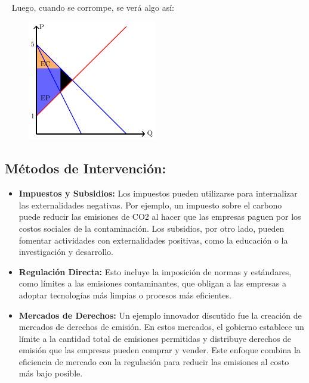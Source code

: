 \documentclass[
  letterpaper,
  DIV=11,
  numbers=noendperiod]{scrreport}
\begin{document}
~ Luego, cuando se corrompe, se verá algo así:

\begin{figure}

{\centering \includegraphics[width=0.5\textwidth,height=\textheight]{4sistimpo_files/figure-pdf/unnamed-chunk-2-1.pdf}

}

\end{figure}

\hypertarget{muxe9todos-de-intervenciuxf3n}{%
\subsection{Métodos de
Intervención:}\label{muxe9todos-de-intervenciuxf3n}}

\begin{itemize}
\item
  \textbf{Impuestos y Subsidios:} Los impuestos pueden utilizarse para
  internalizar las externalidades negativas. Por ejemplo, un impuesto
  sobre el carbono puede reducir las emisiones de CO2 al hacer que las
  empresas paguen por los costos sociales de la contaminación. Los
  subsidios, por otro lado, pueden fomentar actividades con
  externalidades positivas, como la educación o la investigación y
  desarrollo.
\item
  \textbf{Regulación Directa:} Esto incluye la imposición de normas y
  estándares, como límites a las emisiones contaminantes, que obligan a
  las empresas a adoptar tecnologías más limpias o procesos más
  eficientes.
\item
  \textbf{Mercados de Derechos:} Un ejemplo innovador discutido fue la
  creación de mercados de derechos de emisión. En estos mercados, el
  gobierno establece un límite a la cantidad total de emisiones
  permitidas y distribuye derechos de emisión que las empresas pueden
  comprar y vender. Este enfoque combina la eficiencia de mercado con la
  regulación para reducir las emisiones al costo más bajo posible.
\end{itemize}
\end{document}
